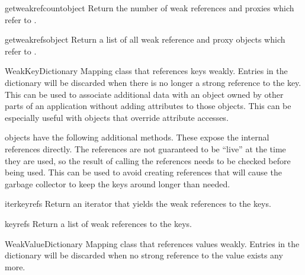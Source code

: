 \begin{funcdesc}{getweakrefcount}{object}
  Return the number of weak references and proxies which refer to
  .
\end{funcdesc}

\begin{funcdesc}{getweakrefs}{object}
  Return a list of all weak reference and proxy objects which refer to
  .
\end{funcdesc}

\begin{classdesc}{WeakKeyDictionary}{}
  Mapping class that references keys weakly.  Entries in the
  dictionary will be discarded when there is no longer a strong
  reference to the key.  This can be used to associate additional data
  with an object owned by other parts of an application without adding
  attributes to those objects.  This can be especially useful with
  objects that override attribute accesses.

\end{classdesc}

 objects have the following additional
methods.  These expose the internal references directly.  The
references are not guaranteed to be ``live'' at the time they are
used, so the result of calling the references needs to be checked
before being used.  This can be used to avoid creating references that
will cause the garbage collector to keep the keys around longer than
needed.

\begin{methoddesc}{iterkeyrefs}{}
  Return an iterator that yields the weak references to the keys.
\end{methoddesc}

\begin{methoddesc}{keyrefs}{}
  Return a list of weak references to the keys.
\end{methoddesc}

\begin{classdesc}{WeakValueDictionary}{}
  Mapping class that references values weakly.  Entries in the
  dictionary will be discarded when no strong reference to the value
  exists any more.

\end{classdesc}

